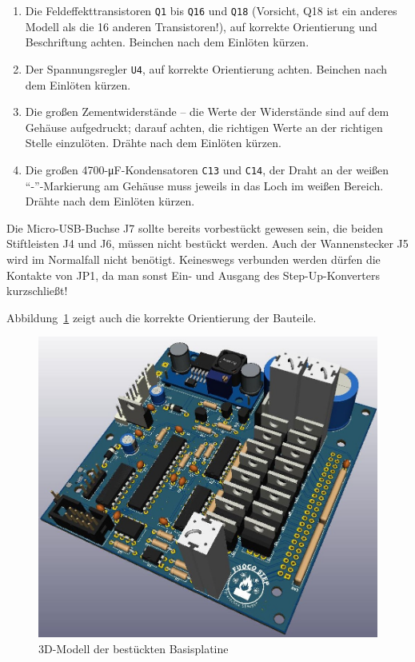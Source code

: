 \documentclass[paper=a4, open=any]{scrbook}
\begin{document}
\begin{enumerate}
					\item Die Feldeffekttransistoren \texttt{Q1} bis \texttt{Q16} und \texttt{Q18} (Vorsicht, Q18 ist ein anderes Modell als die 16 anderen Transistoren!), auf korrekte Orientierung und Beschriftung achten. Beinchen nach dem Einlöten kürzen.
					\item Der Spannungsregler \texttt{U4}, auf korrekte Orientierung achten. Beinchen nach dem Einlöten kürzen.
					\item Die großen Zementwiderstände -- die Werte der Widerstände sind auf dem Gehäuse aufgedruckt; darauf achten, die richtigen Werte an der richtigen Stelle einzulöten.  Drähte nach dem Einlöten kürzen.
					\item Die großen 4700-\si{\micro\farad}-Kondensatoren \texttt{C13} und \texttt{C14}, der Draht an der weißen \enquote{-}-Markierung am Gehäuse muss jeweils in das Loch im weißen Bereich. Drähte nach dem Einlöten kürzen.
				\end{enumerate}

				Die Micro-USB-Buchse J7 sollte bereits vorbestückt gewesen sein, die beiden Stiftleisten J4 und J6, müssen nicht bestückt werden. Auch der Wannenstecker J5 wird im Normalfall nicht benötigt. Keineswegs verbunden werden dürfen die Kontakte von JP1, da man sonst Ein- und Ausgang des Step-Up-Konverters kurzschließt!

				Abbildung~\ref{fig:base3d} zeigt auch die korrekte Orientierung der Bauteile.

				\begin{figure}
					\centering\includegraphics[width=\textwidth]{base3d}
					\caption{3D-Modell der bestückten Basisplatine}
					\label{fig:base3d}
				\end{figure}
\end{document}

